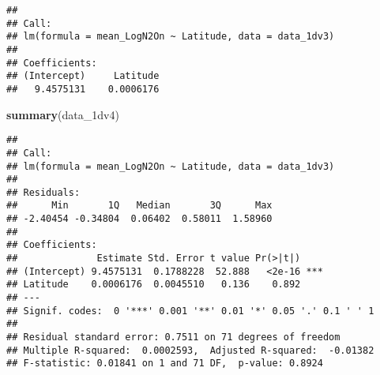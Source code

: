 \documentclass[
]{article}
\newenvironment{Shaded}{\begin{snugshade}}{\end{snugshade}}
\newcommand{\FunctionTok}[1]{\textcolor[rgb]{0.13,0.29,0.53}{\textbf{#1}}}
\newcommand{\NormalTok}[1]{#1}
\begin{document}
\begin{verbatim}
## 
## Call:
## lm(formula = mean_LogN2On ~ Latitude, data = data_1dv3)
## 
## Coefficients:
## (Intercept)     Latitude  
##   9.4575131    0.0006176
\end{verbatim}

\begin{Shaded}
\begin{Highlighting}[]
\FunctionTok{summary}\NormalTok{(data\_1dv4)}
\end{Highlighting}
\end{Shaded}

\begin{verbatim}
## 
## Call:
## lm(formula = mean_LogN2On ~ Latitude, data = data_1dv3)
## 
## Residuals:
##      Min       1Q   Median       3Q      Max 
## -2.40454 -0.34804  0.06402  0.58011  1.58960 
## 
## Coefficients:
##              Estimate Std. Error t value Pr(>|t|)    
## (Intercept) 9.4575131  0.1788228  52.888   <2e-16 ***
## Latitude    0.0006176  0.0045510   0.136    0.892    
## ---
## Signif. codes:  0 '***' 0.001 '**' 0.01 '*' 0.05 '.' 0.1 ' ' 1
## 
## Residual standard error: 0.7511 on 71 degrees of freedom
## Multiple R-squared:  0.0002593,  Adjusted R-squared:  -0.01382 
## F-statistic: 0.01841 on 1 and 71 DF,  p-value: 0.8924
\end{verbatim}
\end{document}
